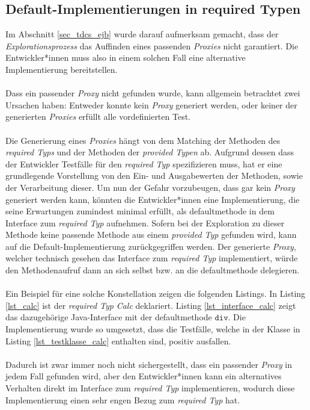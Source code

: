 \subsection{Default-Implementierungen in required Typen}
Im Abschnitt \ref{sec_tdcs_ejb} wurde darauf aufmerksam gemacht, dass der \emph{Explorationsprozess} das Auffinden eines passenden \emph{Proxies} nicht garantiert. Die Entwickler*innen muss also in einem solchen Fall eine alternative Implementierung bereitstellen.
\\\\
Dass ein passender \emph{Proxy} nicht gefunden wurde, kann allgemein betrachtet zwei Ursachen haben: Entweder konnte kein \emph{Proxy} generiert werden, oder keiner der generierten \emph{Proxies} erfüllt alle vordefinierten Test. 
\\\\
Die Generierung eines \emph{Proxies} hängt von dem Matching der Methoden des \emph{required Typs} und der Methoden der \emph{provided Typen} ab. Aufgrund dessen dass der Entwickler Testfälle für den \emph{required Typ} spezifizieren muss, hat er eine grundlegende Vorstellung von den Ein- und Ausgabewerten der Methoden, sowie der Verarbeitung dieser. Um nun der Gefahr vorzubeugen, dass gar kein \emph{Proxy} generiert werden kann, könnten die Entwickler*innen eine Implementierung, die seine Erwartungen zumindest minimal erfüllt, als \Gls{defaultmethode} in dem \Gls{Interface} zum \emph{required Typ} aufnehmen. Sofern bei der Exploration zu dieser Methode keine passende Methode aus einem \emph{provided Typ} gefunden wird, kann auf die Default-Implementierung zurückgegriffen werden. Der generierte \emph{Proxy}, welcher technisch gesehen das \Gls{Interface} zum \emph{required Typ} implementiert, würde den Methodenaufruf dann an sich selbst bzw. an die \Gls{defaultmethode} delegieren.
\\\\
Ein Beispiel für eine solche Konstellation zeigen die folgenden Listings. In Listing \ref{lst_calc} ist der \emph{required Typ} \emph{Calc} deklariert. Listing \ref{lst_interface_calc} zeigt das dazugehörige Java-\Gls{Interface} mit der \Gls{defaultmethode} $\texttt{div}$. Die Implementierung wurde so umgesetzt, dass die Testfälle, welche in der Klasse in Listing \ref{lst_testklasse_calc} enthalten sind, positiv ausfallen.
\\\\
Dadurch ist zwar immer noch nicht sichergestellt, dass ein passender \emph{Proxy} in jedem Fall gefunden wird, aber den Entwickler*innen kann ein alternatives Verhalten direkt im \Gls{Interface} zum \emph{required Typ} implementieren, wodurch diese Implementierung einen sehr engen Bezug zum \emph{required Typ} hat.
